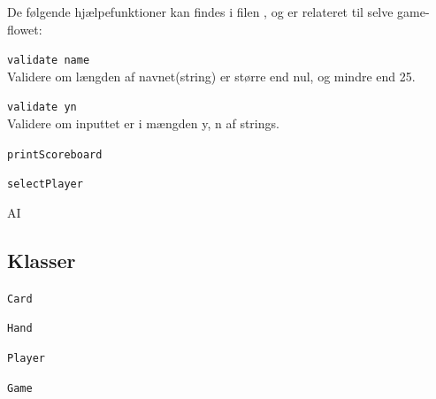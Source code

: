 \documentclass[a4paper]{article}
\begin{document}
      De følgende hjælpefunktioner kan findes i filen , og er relateret til selve game-flowet:
      \begin{description}
        \item{\texttt{validate name}}~\\
          Validere om længden af navnet(string) er større end nul,
          og mindre end 25.
      
        \item{\texttt{validate yn}}~\\
          Validere om inputtet er i mængden {y, n} af strings.

        \item{\texttt{printScoreboard}}~\\

        \item{\texttt{select\texttt{Player}}}~\\

        \item{AI}~\\
      \end{description}
      
    \subsection{Klasser} \label{ssec:classes}
      \begin{description}
        \item{\texttt{\texttt{Card}}}~\\
        \item{\texttt{\texttt{Hand}}}~\\
        \item{\texttt{\texttt{Player}}}~\\
        \item{\texttt{Game}}~\\
      \end{description}
    
\end{document}
